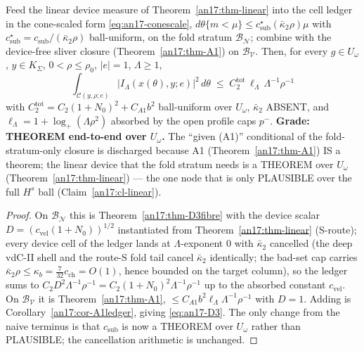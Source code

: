 \begin{proposition}\label{an17:prop-D3}\label{an17:D3}\label{prop:an-D3}%
Feed the linear device measure of Theorem~\ref{an17:thm-linear} into the cell
ledger in the cone-scaled form \eqref{eq:an17-conescale},
$d\theta\{m<\mu\}\le c_{\mathrm{sub}}^\star(\bar\kappa_2\rho)\mu$ with
$c_{\mathrm{sub}}^\star=c_{\mathrm{sub}}/(\bar\kappa_2\rho)$ ball-uniform, on the
fold stratum $\mathcal B_{\mathcal N}$; combine with the device-free sliver closure
(Theorem~\ref{an17:thm-A1}) on $\mathcal B_{\mathcal V}$. Then, for every $g\in
U_\omega$, $y\in K_\Sigma$, $0<\rho\le\rho_0$, $|e|=1$, $\Lambda\ge1$,
\begin{equation}\label{eq:an17-D3}
 \int_{\mathcal C(y,\rho;e)}|I_\Lambda(x(\theta),y;e)|^2\,d\theta\;\le\;
 C_2^{\mathrm{tot}}\,\ell_\Lambda\,\Lambda^{-1}\rho^{-1}
\end{equation}
with $C_2^{\mathrm{tot}}=C_2(1+N_0)^2+C_{A1}b^2$ ball-uniform over $U_\omega$,
$\bar\kappa_2$ ABSENT, and $\ell_\Lambda=1+\log_+(\Lambda\rho^2)$ absorbed by the
open profile caps $p^-$. \textbf{Grade: THEOREM end-to-end over $U_\omega$.} The
``given (A1)'' conditional of the fold-stratum-only closure is discharged because
A1 (Theorem~\ref{an17:thm-A1}) IS a theorem; the linear device that the fold
stratum needs is a THEOREM over $U_\omega$ (Theorem~\ref{an17:thm-linear}) --- the
one node that is only PLAUSIBLE over the full $H^s$ ball (Claim~\ref{an17:cl-linear}).
\end{proposition}
\begin{proof}
On $\mathcal B_{\mathcal N}$ this is Theorem~\ref{an17:thm-D3fibre} with the device
scalar $D=(c_{\mathrm{vel}}(1+N_0))^{1/2}$ instantiated from
Theorem~\ref{an17:thm-linear} (S-route); every device cell of the ledger lands at
$\Lambda$-exponent $0$ with $\bar\kappa_2$ cancelled (the deep vdC-II shell and the
route-S fold tail cancel $\bar\kappa_2$ identically; the bad-set cap carries
$\bar\kappa_2\rho\le\kappa_b=\tfrac7{32}c_{\mathrm{ch}}=O(1)$, hence bounded on the
target column), so the ledger sums to $C_2 D^2\Lambda^{-1}\rho^{-1}=C_2(1+N_0)^2
\Lambda^{-1}\rho^{-1}$ up to the absorbed constant $c_{\mathrm{vel}}$. On
$\mathcal B_{\mathcal V}$ it is Theorem~\ref{an17:thm-A1}, $\le C_{A1}b^2\ell_\Lambda
\Lambda^{-1}\rho^{-1}$ with $D=1$. Adding is Corollary~\ref{an17:cor-A1ledger},
giving \eqref{eq:an17-D3}. The only change from the naive terminus is that
$c_{\mathrm{sub}}$ is now a THEOREM over $U_\omega$ rather than PLAUSIBLE; the
cancellation arithmetic is unchanged.
\end{proof}


